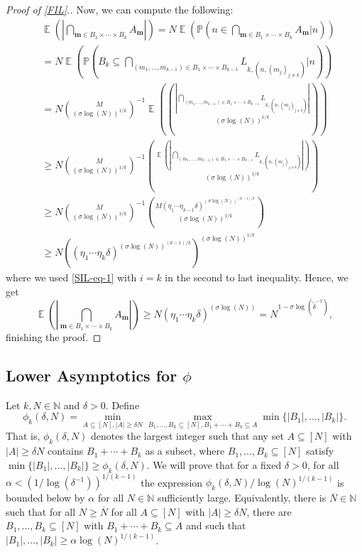 \documentclass[letter, 11pt]{article}
\theoremstyle{plain} %
\theoremstyle{definition} %
\theoremstyle{plain}
\theoremstyle{plain}
\newcommand{\N}{\mathbb{N}}
\renewcommand{\P}{\mathbb{P}}
\newcommand{\1}{\mathbbm{1}}
\newcommand{\E}{\operatorname{\mathbb{E}}}
\begin{document}
\begin{proof}[Proof of \cref{FIL}.]
    Now, we can compute the following:
    \begin{align*}
        &\E\left( \left| \bigcap_{\boldsymbol{m}\in B_1\times \cdots \times B_{k}} A_{\boldsymbol{m}} \right| \right)= N \E\left( \P\left(n\in  \bigcap_{\boldsymbol{m}\in B_1\times \cdots \times B_{k}} A_{\boldsymbol{m}} \Bigg| n\right) \right)\\
        &= N \E\left( \P\left( B_k \subseteq \bigcap_{( m_1,\ldots,m_{k-1})\in  B_1\times \cdots \times B_{k-1} } L_{k,(n,(m_j)_{j\neq k })}  \Bigg| n \right)\right)\\
        &=N \binom{M}{ (\sigma \log(N))^{1/k}}^{-1}  \E\left( \binom{\left|\bigcap_{( m_1,\ldots,m_{k-1})\in  B_1\times \cdots \times B_{k-1} } L_{k,(n,(m_j)_{j\neq k })} \right|}{ (\sigma \log(N))^{1/k}} \right)\\
        &\geq N \binom{M}{ (\sigma \log(N))^{1/k}}^{-1} \binom{  \E\left(\left|\bigcap_{( m_1,\ldots,m_{k-1})\in  B_1\times \cdots \times B_{k-1} } L_{k,(n,(m_j)_{j\neq k })} \right| \right)}{ (\sigma \log(N))^{1/k}} \\
        &\geq N \binom{M}{ (\sigma \log(N))^{1/k}}^{-1} \binom{ M(\eta_1\cdots\eta_{k-1}\delta)^{(\sigma \log(N))^{(k-1)/k}}  }{ (\sigma \log(N))^{1/k}} \\
        &\geq N ((\eta_1\cdots\eta_{k}\delta)^{(\sigma \log(N))^{(k-1)/k}} )^{ (\sigma \log(N))^{1/k}}
    \end{align*}
    where we used \cref{SIL-eq-1} with $i=k$ in the second to last inequality. Hence, we get  
    $$\E\left( \left| \bigcap_{\boldsymbol{m}\in B_1\times \cdots \times B_{k}} A_{\boldsymbol{m}} \right| \right) \geq  N (\eta_1\cdots\eta_{k}\delta)^{(\sigma \log(N)) }  = N^{1-\sigma \log(\tilde{\delta}^{-1})},  $$
    finishing the proof.
\end{proof}

\subsection{Lower Asymptotics for $\phi$}

Let $k,N\in \N$ and $\delta>0 $. Define
$$ \phi_k(\delta,N)= \min_{A\subseteq [N], |A|\geq \delta N} \max_{B_1,\ldots,B_k\subseteq [N], B_1+\cdots+B_k\subseteq A} \min\{|B_1|,\ldots,|B_k|\}.$$
That is, $\phi_k(\delta,N)$ denotes the largest integer such that any set $A\subseteq [N]$ with $|A|\geq \delta N$ contains $B_1+\cdots+B_k$ as a subset, where $B_1,\ldots,B_k\subseteq [N]$ satisfy $\min\{|B_1|,\ldots, |B_k|\} \geq \phi_k(\delta,N)$.
We will prove that for a fixed $\delta>0$, for all $\alpha<(1/\log(\delta^{-1}))^{1/(k-1)}$ the expression $\phi_k(\delta,N)/\log(N)^{1/(k-1)}$ is bounded below by $\alpha$ for all $N\in \N$ sufficiently large. Equivalently, there is $\overline{N}\in \N$ such that for all $N\geq \overline{N}$ for all $A\subseteq [N]$ with $|A|\geq \delta N$, there are $B_1,\ldots,B_k\subseteq [N]$ with $B_1+\cdots+B_k\subseteq A$ and such that $|B_1|,\ldots,|B_k|\geq \alpha \log(N)^{1/(k-1)}$.
\end{document}
